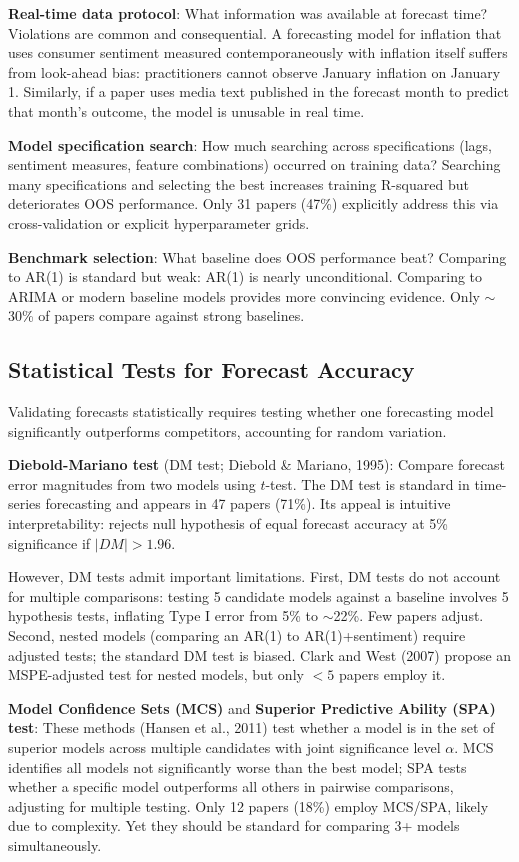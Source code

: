 \documentclass[11pt]{article}
\begin{document}
\textbf{Real-time data protocol}: What information was available at forecast time? Violations are common and consequential. A forecasting model for inflation that uses consumer sentiment measured contemporaneously with inflation itself suffers from look-ahead bias: practitioners cannot observe January inflation on January 1. Similarly, if a paper uses media text published in the forecast month to predict that month's outcome, the model is unusable in real time.

\textbf{Model specification search}: How much searching across specifications (lags, sentiment measures, feature combinations) occurred on training data? Searching many specifications and selecting the best increases training R-squared but deteriorates OOS performance. Only 31 papers (47\%) explicitly address this via cross-validation or explicit hyperparameter grids.

\textbf{Benchmark selection}: What baseline does OOS performance beat? Comparing to AR(1) is standard but weak: AR(1) is nearly unconditional. Comparing to ARIMA or modern baseline models provides more convincing evidence. Only $\sim$30\% of papers compare against strong baselines.

\subsection{Statistical Tests for Forecast Accuracy}

Validating forecasts statistically requires testing whether one forecasting model significantly outperforms competitors, accounting for random variation.

\textbf{Diebold-Mariano test} (DM test; Diebold \& Mariano, 1995): Compare forecast error magnitudes from two models using $t$-test. The DM test is standard in time-series forecasting and appears in 47 papers (71\%). Its appeal is intuitive interpretability: rejects null hypothesis of equal forecast accuracy at 5\% significance if $|DM| > 1.96$. 

However, DM tests admit important limitations. First, DM tests do not account for multiple comparisons: testing 5 candidate models against a baseline involves 5 hypothesis tests, inflating Type I error from 5\% to $\sim$22\%. Few papers adjust. Second, nested models (comparing an AR(1) to AR(1)+sentiment) require adjusted tests; the standard DM test is biased. Clark and West (2007) propose an MSPE-adjusted test for nested models, but only $<5$ papers employ it.

\textbf{Model Confidence Sets (MCS)} and \textbf{Superior Predictive Ability (SPA) test}: These methods (Hansen et al., 2011) test whether a model is in the set of superior models across multiple candidates with joint significance level $\alpha$. MCS identifies all models not significantly worse than the best model; SPA tests whether a specific model outperforms all others in pairwise comparisons, adjusting for multiple testing. Only 12 papers (18\%) employ MCS/SPA, likely due to complexity. Yet they should be standard for comparing 3+ models simultaneously.
\end{document}
